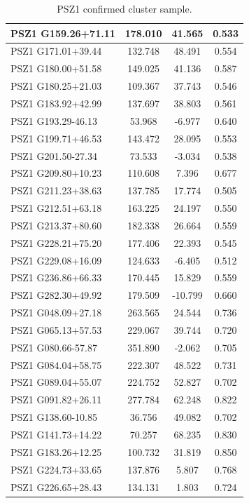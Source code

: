 \documentclass[11pt,a4paper,twoside,graphicx,color]{article}
\begin{document}
\begin{table}
\begin{tabular}{|l  || c | c | c | }
PSZ1 G159.26+71.11 & 178.010 &  41.565 &   0.533 \\ \hline
PSZ1 G171.01+39.44 & 132.748 &  48.491 &   0.554 \\ \hline
PSZ1 G180.00+51.58 & 149.025 &  41.136 &   0.587 \\ \hline
PSZ1 G180.25+21.03 & 109.367 &  37.743 &   0.546 \\ \hline
PSZ1 G183.92+42.99 & 137.697 &  38.803 &   0.561 \\ \hline
PSZ1 G193.29-46.13 &  53.968 &  -6.977 &   0.640 \\ \hline
PSZ1 G199.71+46.53 & 143.472 &  28.095 &   0.553 \\ \hline
PSZ1 G201.50-27.34 &  73.533 &  -3.034 &   0.538 \\ \hline
PSZ1 G209.80+10.23 & 110.608 &   7.396 &   0.677 \\ \hline
PSZ1 G211.23+38.63 & 137.785 &  17.774 &   0.505 \\ \hline
PSZ1 G212.51+63.18 & 163.225 &  24.197 &   0.550 \\ \hline
PSZ1 G213.37+80.60 & 182.338 &  26.664 &   0.559 \\ \hline
PSZ1 G228.21+75.20 & 177.406 &  22.393 &   0.545 \\ \hline
PSZ1 G229.08+16.09 & 124.633 &  -6.405 &   0.512 \\ \hline
PSZ1 G236.86+66.33 & 170.445 &  15.829 &   0.559 \\ \hline
PSZ1 G282.30+49.92 & 179.509 & -10.799 &   0.660 \\ \hline
PSZ1 G048.09+27.18 & 263.565 &  24.544 &   0.736 \\ \hline
PSZ1 G065.13+57.53 & 229.067 &  39.744 &   0.720 \\ \hline
PSZ1 G080.66-57.87 & 351.890 &  -2.062 &   0.705 \\ \hline
PSZ1 G084.04+58.75 & 222.307 &  48.522 &   0.731 \\ \hline
PSZ1 G089.04+55.07 & 224.752 &  52.827 &   0.702 \\ \hline
PSZ1 G091.82+26.11 & 277.784 &  62.248 &   0.822 \\ \hline
PSZ1 G138.60-10.85 &  36.756 &  49.082 &   0.702 \\ \hline
PSZ1 G141.73+14.22 &  70.257 &  68.235 &   0.830 \\ \hline
PSZ1 G183.26+12.25 & 100.732 &  31.819 &   0.850 \\ \hline
PSZ1 G224.73+33.65 & 137.876 &   5.807 &   0.768 \\ \hline
PSZ1 G226.65+28.43 & 134.131 &   1.803 &   0.724 \\ \hline
\end{tabular}
\label{tab:PSZ1_sample}
 \caption{PSZ1 confirmed cluster sample.}
\end{table}
\end{document}
